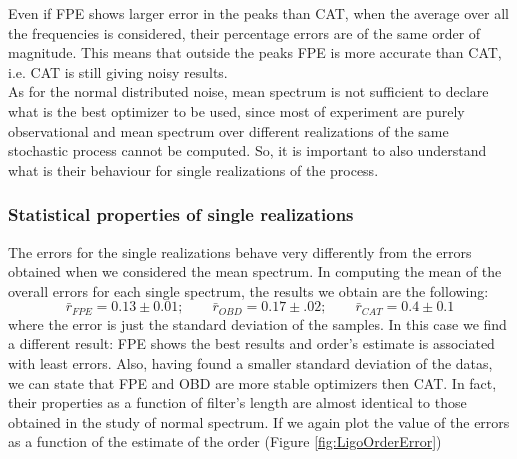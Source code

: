 \documentclass[twocolumn,showpacs,preprintnumbers,nofootinbib,prd,
superscriptaddress,10pt]{revtex4-1}
\begin{document}
Even if FPE shows larger error in the peaks than CAT, when the average over all the frequencies is considered, their percentage errors are of the same order of magnitude. This means that outside the peaks FPE is more accurate than CAT, i.e. CAT is still giving noisy results.\\ 
As for the normal distributed noise, mean spectrum is not sufficient to declare what is the best optimizer to be used, since most of experiment are purely observational and mean spectrum over different realizations of the same stochastic process cannot be computed. So, it is important to also understand what is their behaviour for single realizations of the process.
\subsubsection{Statistical properties of single realizations} 
The errors for the single realizations behave very differently from the errors obtained when we considered the mean spectrum. In computing the mean of the overall errors for each single spectrum, the results we obtain are the following:
\begin{equation}
    \bar{r}_{FPE} = 0.13 \pm 0.01; \qquad \bar{r}_{OBD} = 0.17 \pm .02; \qquad 
    \bar{r}_{CAT} = 0.4 \pm 0.1
\end{equation}
where the error is just the standard deviation of the samples.
In this case we find a different result: FPE shows the best results and order's estimate is associated with least errors. Also, having found a smaller standard deviation of the datas, we can state that FPE and OBD are more stable optimizers then CAT. In fact, their properties as a function of filter's length are almost identical to those obtained in the study of normal spectrum. If we again plot the value of the errors as a function of the estimate of the order (Figure \ref{fig:LigoOrderError})
\end{document}

